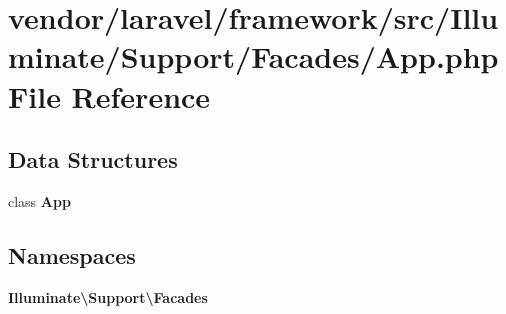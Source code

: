 \section{vendor/laravel/framework/src/\+Illuminate/\+Support/\+Facades/\+App.php File Reference}
\label{vendor_2laravel_2framework_2src_2_illuminate_2_support_2_facades_2app_8php}
\subsection*{Data Structures}
\begin{DoxyCompactItemize}
\item 
class {\bf App}
\end{DoxyCompactItemize}
\subsection*{Namespaces}
\begin{DoxyCompactItemize}
\item 
 {\bf Illuminate\textbackslash{}\+Support\textbackslash{}\+Facades}
\end{DoxyCompactItemize}

